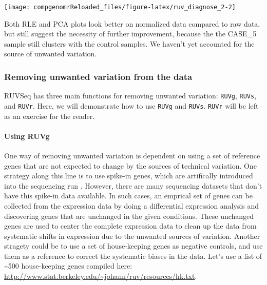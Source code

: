 \documentclass[12pt,]{krantz}
\let\oldparagraph\paragraph
\renewcommand{\paragraph}[1]{\oldparagraph{#1}\mbox{}}
\begin{document}
\begin{center}\texttt{[image: compgenomrReloaded\_files/figure-latex/ruv\_diagnose\_2-2]} \end{center}

Both RLE and PCA plots look better on normalized data compared to raw data, but still suggest the necessity of further improvement, because the the CASE\_5 sample still clusters with the control samples. We haven't yet accounted for the source of unwanted variation.

\hypertarget{removing-unwanted-variation-from-the-data}{%
\subsubsection{Removing unwanted variation from the data}\label{removing-unwanted-variation-from-the-data}}

RUVSeq has three main functions for removing unwanted variation: \texttt{RUVg}, \texttt{RUVs}, and \texttt{RUVr}. Here, we will demonstrate how to use \texttt{RUVg} and \texttt{RUVs}. \texttt{RUVr} will be left as an exercise for the reader.

\hypertarget{using-ruvg}{%
\paragraph{Using RUVg}\label{using-ruvg}}

One way of removing unwanted variation is dependent on using a set of reference genes that are not expected to change by the sources of technical variation. One strategy along this line is to use spike-in genes, which are artifically introduced into the sequencing run \citep{jiang_synthetic_2011}. However, there are many sequencing datasets that don't have this spike-in data available. In such cases, an emprical set of genes can be collected from the expression data by doing a differential expression analysis and discovering genes that are unchanged in the given conditions. These unchanged genes are used to center the complete expression data to clean up the data from systematic shifts in expression due to the unwanted sources of variation. Another stragety could be to use a set of house-keeping genes as negative controls, and use them as a reference to correct the systematic biases in the data. Let's use a list of \textasciitilde{}500 house-keeping genes compiled here: \url{http://www.stat.berkeley.edu/~johann/ruv/resources/hk.txt}.
\end{document}
